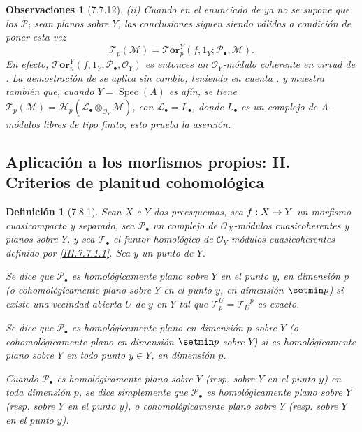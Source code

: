 \documentclass[10pt,oneside,openany]{book}
\theoremstyle{egaenv}\newtheorem*{env}{---}
\theoremstyle{egastatement}
\theoremstyle{egadescription}
\newtheorem*{definition}{Definición}
\newtheorem*{remarks}{Observaciones}
\newcommand{\oldpage}[2][]{\marginnote{\normalfont\scriptsize\textbf{#1}\,|\,#2}\ignorespaces}
\renewcommand{\to}{\mathchoice{\longrightarrow}{\rightarrow}{\rightarrow}{\rightarrow}}
\begin{document}
\begin{remarks}[7.7.12]
\medskip
\textnormal{(ii)} Cuando en el enunciado de  ya no se supone
que los $\mathscr P_i$ sean planos sobre $Y$, las conclusiones siguen siendo
válidas a condición de poner esta vez
\[
  \mathscr T_p(\mathscr M)
  =
  \boldsymbol{\mathscr{T}\!or}^Y_p
    (f,1_Y;\mathscr P_\bullet,\mathscr M).
  \tag{7.7.12.1}\label{III.7.7.12.1.fr}
\]
En efecto,
$\boldsymbol{\mathscr{T}\!or}^Y_n(f,1_Y;\mathscr P_\bullet,\mathscr O_Y)$ es entonces un
$\mathscr O_Y$-módulo \emph{coherente} en virtud de . La
demostración de  se aplica sin cambio, teniendo en cuenta
, y muestra también que, cuando
$Y=\operatorname{Spec}(A)$ es afín, se tiene
$\mathscr T_p(\mathscr M)=\mathscr H_p(\mathscr L_\bullet\otimes_{\mathscr O_Y}\mathscr M)$,
con $\mathscr L_\bullet=\widetilde{L}_\bullet$,
donde $L_\bullet$ es un complejo de $A$-módulos libres de tipo finito; esto
prueba la aserción.
\end{remarks}

\subsection{Aplicación a los morfismos propios: II. Criterios de planitud cohomológica}
\label{subsection:III.7.8}
\label{subsection:III.7.8.fr}
\label{III.7.8}

\begin{definition}[7.8.1]
\label{III.7.8.1}
Sean $X$ e $Y$ dos preesquemas, sea $f:X\to Y$ un morfismo
cuasicompacto y separado, sea $\mathscr P_\bullet$ un complejo de
$\mathscr O_X$-módulos cuasicoherentes y planos sobre $Y$, y sea
$\mathscr T_\bullet$ el funtor homológico de $\mathscr O_Y$-módulos
cuasicoherentes definido por \eqref{III.7.7.1.1}. Sea $y$ un punto
de $Y$.

Se dice que $\mathscr P_\bullet$ es
\oldpage[III]{205}
homológicamente plano sobre
$Y$ en el punto $y$, en dimensión $p$ \textup{(o} cohomológicamente
plano sobre $Y$ en el punto $y$, en dimensión $\setmin p$) si existe una
vecindad abierta $U$ de $y$ en $Y$ tal que
$\mathscr T_p^U=\mathscr T_U^{-p}$
es exacto.

Se dice que $\mathscr P_\bullet$ es homológicamente plano en
dimensión $p$ sobre $Y$ \textup{(o} cohomológicamente plano en
dimensión $\setmin p$ sobre $Y$) si es homológicamente plano sobre $Y$ en
todo punto $y\in Y$, en dimensión $p$.

\upshape Cuando $\mathscr P_\bullet$ es homológicamente plano sobre $Y$
(resp. sobre $Y$ en el punto $y$) en \emph{toda}
dimensión $p$, se dice simplemente que $\mathscr P_\bullet$ es
\emph{homológicamente plano sobre $Y$} (resp. sobre $Y$
en el punto $y$), o \emph{cohomológicamente plano sobre $Y$}
(resp. sobre $Y$ en el punto $y$).
\end{definition}
\end{document}

